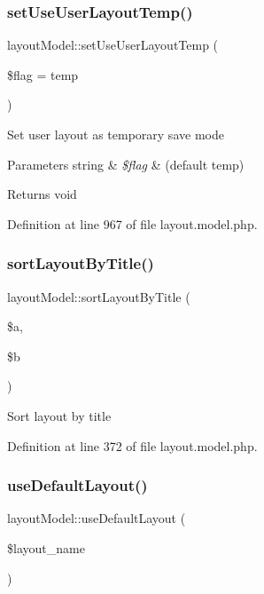 \subsubsection{\texorpdfstring{set\+Use\+User\+Layout\+Temp()}{setUseUserLayoutTemp()}}
{\footnotesize\ttfamily layout\+Model\+::set\+Use\+User\+Layout\+Temp (\begin{DoxyParamCaption}\item[{}]{\$flag = {\ttfamily \textquotesingle{}temp\textquotesingle{}} }\end{DoxyParamCaption})}

Set user layout as temporary save mode 
\begin{DoxyParams}[1]{Parameters}
string & {\em \$flag} & (default \textquotesingle{}temp\textquotesingle{}) \\
\hline
\end{DoxyParams}
\begin{DoxyReturn}{Returns}
void 
\end{DoxyReturn}


Definition at line 967 of file layout.\+model.\+php.

\hypertarget{classlayoutModel_a2fe5cbdc4be434f56cc1fed03588d1f4}{}\label{classlayoutModel_a2fe5cbdc4be434f56cc1fed03588d1f4} 
\subsubsection{\texorpdfstring{sort\+Layout\+By\+Title()}{sortLayoutByTitle()}}
{\footnotesize\ttfamily layout\+Model\+::sort\+Layout\+By\+Title (\begin{DoxyParamCaption}\item[{}]{\$a,  }\item[{}]{\$b }\end{DoxyParamCaption})}

Sort layout by title 

Definition at line 372 of file layout.\+model.\+php.

\hypertarget{classlayoutModel_a85dfbba773c086806d4d8c9586d16e52}{}\label{classlayoutModel_a85dfbba773c086806d4d8c9586d16e52} 
\subsubsection{\texorpdfstring{use\+Default\+Layout()}{useDefaultLayout()}}
{\footnotesize\ttfamily layout\+Model\+::use\+Default\+Layout (\begin{DoxyParamCaption}\item[{}]{\$layout\+\_\+name }\end{DoxyParamCaption})}

